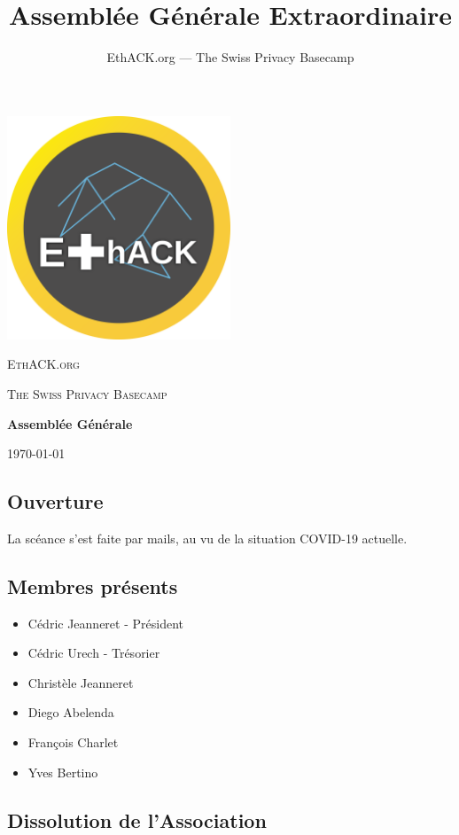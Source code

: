 \documentclass[12pt,twoside]{report}
\author{EthACK.org — The Swiss Privacy Basecamp}
\title{Assemblée Générale Extraordinaire}
\begin{document}
\begin{titlepage}
\centering
\includegraphics[width=0.50\textwidth]{../logo-4096.png}\par\vspace{2cm}
{\scshape\LARGE EthACK.org \par}
\vspace{1cm}
{\scshape\Large The Swiss Privacy Basecamp \par}
\vspace{1.5cm}
{\huge\bfseries Assemblée Générale\par}

\vfill
{\large \today\par}
\end{titlepage}
\setlength{\parindent}{0cm}

\subsection*{Ouverture}
La scéance s'est faite par mails, au vu de la situation COVID-19 actuelle.


\subsection*{Membres présents}
\begin{itemize}
\item Cédric Jeanneret - Président
\item Cédric Urech - Trésorier
\item Christèle Jeanneret
\item Diego Abelenda
\item François Charlet
\item Yves Bertino
\end{itemize}

\subsection*{Dissolution de l'Association}
\end{document}
